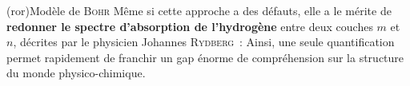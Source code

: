 \documentclass[../../main/main.tex]{subfiles}
\begin{document}
\begin{tcb*}(ror){Modèle de \textsc{Bohr}}
	Même si cette approche a des défauts, elle a le mérite de \textbf{redonner le
		spectre d'absorption de l'hydrogène} entre deux couches $m$ et $n$, décrites
	par le physicien Johannes \textsc{Rydberg}~:
	\psw{%
		\[
			\frac{1}{\lambda_{n,m}} = R_H \left( \frac{1}{m^2} - \frac{1}{n^2} \right)
			\qav
			R_H = \frac{E_1}{hc} = \frac{m_e e^4}{8\ep_0^2 h^3 c} \approx \SI{1.10e7}{m^{-1}}
		\]
	}%
	Ainsi, une seule quantification permet rapidement de franchir un gap énorme
	de compréhension sur la structure du monde physico-chimique.
\end{tcb*}
\end{document}
